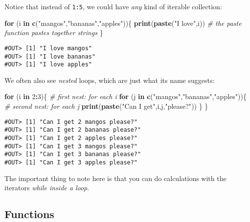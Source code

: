 \documentclass[]{book}
\newenvironment{Shaded}{\begin{snugshade}}{\end{snugshade}}
\newcommand{\KeywordTok}[1]{\textcolor[rgb]{0.13,0.29,0.53}{\textbf{#1}}}
\newcommand{\DecValTok}[1]{\textcolor[rgb]{0.00,0.00,0.81}{#1}}
\newcommand{\StringTok}[1]{\textcolor[rgb]{0.31,0.60,0.02}{#1}}
\newcommand{\CommentTok}[1]{\textcolor[rgb]{0.56,0.35,0.01}{\textit{#1}}}
\newcommand{\ControlFlowTok}[1]{\textcolor[rgb]{0.13,0.29,0.53}{\textbf{#1}}}
\newcommand{\OperatorTok}[1]{\textcolor[rgb]{0.81,0.36,0.00}{\textbf{#1}}}
\newcommand{\NormalTok}[1]{#1}
\begin{document}
Notice that instead of \texttt{1:5}, we could have \emph{any} kind of
iterable collection:

\begin{Shaded}
\begin{Highlighting}[]
\ControlFlowTok{for}\NormalTok{ (i }\ControlFlowTok{in} \KeywordTok{c}\NormalTok{(}\StringTok{"mangos"}\NormalTok{,}\StringTok{"bananas"}\NormalTok{,}\StringTok{"apples"}\NormalTok{))\{}
  \KeywordTok{print}\NormalTok{(}\KeywordTok{paste}\NormalTok{(}\StringTok{"I love"}\NormalTok{,i))  }\CommentTok{# the paste function pastes together strings}
\NormalTok{\}}
\end{Highlighting}
\end{Shaded}

\begin{verbatim}
#OUT> [1] "I love mangos"
#OUT> [1] "I love bananas"
#OUT> [1] "I love apples"
\end{verbatim}

We often also see \emph{nested} loops, which are just what its name
suggests:

\begin{Shaded}
\begin{Highlighting}[]
\ControlFlowTok{for}\NormalTok{ (i }\ControlFlowTok{in} \DecValTok{2}\OperatorTok{:}\DecValTok{3}\NormalTok{)\{}
  \CommentTok{# first nest: for each i}
  \ControlFlowTok{for}\NormalTok{ (j }\ControlFlowTok{in} \KeywordTok{c}\NormalTok{(}\StringTok{"mangos"}\NormalTok{,}\StringTok{"bananas"}\NormalTok{,}\StringTok{"apples"}\NormalTok{))\{}
    \CommentTok{# second nest: for each j}
    \KeywordTok{print}\NormalTok{(}\KeywordTok{paste}\NormalTok{(}\StringTok{"Can I get"}\NormalTok{,i,j,}\StringTok{"please?"}\NormalTok{))}
\NormalTok{  \}}
\NormalTok{\}}
\end{Highlighting}
\end{Shaded}

\begin{verbatim}
#OUT> [1] "Can I get 2 mangos please?"
#OUT> [1] "Can I get 2 bananas please?"
#OUT> [1] "Can I get 2 apples please?"
#OUT> [1] "Can I get 3 mangos please?"
#OUT> [1] "Can I get 3 bananas please?"
#OUT> [1] "Can I get 3 apples please?"
\end{verbatim}

The important thing to note here is that you can do calculations with
the iterators \emph{while inside a loop}.

\subsection{Functions}\label{functions}
\end{document}

